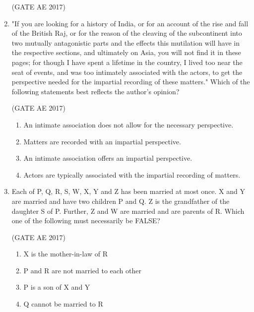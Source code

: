 \documentclass[journal,12pt,onecolumn]{IEEEtran}
\theoremstyle{remark}
\begin{document}
\begin{flushleft}
\begin{enumerate}
\hfill (GATE AE 2017)

\begin{enumerate}
\end{enumerate}

\item "If you are looking for a history of India, or for an account of the rise and fall of the British Raj, or for the reason of the cleaving of the subcontinent into two mutually antagonistic parts and the effects this mutilation will have in the respective sections, and ultimately on Asia, you will not find it in these pages; for though I have spent a lifetime in the country, I lived too near the seat of events, and was too intimately associated with the actors, to get the perspective needed for the impartial recording of these matters."  
Which of the following statements best reflects the author's opinion?

\hfill (GATE AE 2017)

\begin{enumerate}
\item An intimate association does not allow for the necessary perspective.
\item Matters are recorded with an impartial perspective.
\item An intimate association offers an impartial perspective.
\item Actors are typically associated with the impartial recording of matters.
\end{enumerate}

\item Each of P, Q, R, S, W, X, Y and Z has been married at most once. X and Y are married and have two children P and Q. Z is the grandfather of the daughter S of P. Further, Z and W are married and are parents of R. Which one of the following must necessarily be FALSE?

\hfill (GATE AE 2017)

\begin{enumerate}
\item X is the mother-in-law of R
\item P and R are not married to each other
\item P is a son of X and Y
\item Q cannot be married to R
\end{enumerate}


\end{enumerate}
\end{flushleft}
\end{document}
